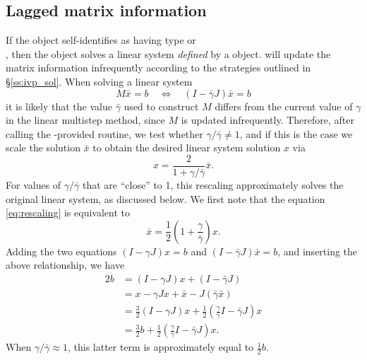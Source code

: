 \subsection{Lagged matrix information}
\label{ss:sunlinsol_lagged_matrix}

If the {\sunlinsol} object self-identifies as having type
 or \\ \noindent
{}, then the {\sunlinsol} object solves a
linear system \emph{defined} by a {\sunmatrix} object. {\cvls} will update the
matrix information infrequently according to the strategies outlined in
\S\ref{ss:ivp_sol}. When solving a linear system
\[
  M\bar{x} = b \quad\Leftrightarrow\quad (I-\bar{\gamma} J)\bar{x} = b
\]
it is likely that the value $\bar{\gamma}$ used to construct $M$
differs from the current value of $\gamma$ in the linear multistep method, since
$M$ is updated infrequently.  Therefore, after calling the
{\sunlinsol}-provided  routine, we test whether
$\gamma / \bar{\gamma} \ne 1$, and if this is the case we scale
the solution $\bar{x}$ to obtain the desired linear system
solution $x$ via
\begin{equation}
  \label{eq:rescaling}
  x = \frac{2}{1 + \gamma / \bar{\gamma}} \bar{x}.
\end{equation}
For values of $\gamma/\bar{\gamma}$ that are ``close'' to 1, this
rescaling approximately solves the original linear system, as
discussed below.  We first note that the equation \eqref{eq:rescaling}
is equivalent to
\[
  \bar{x} = \frac12 \left(1 + \frac{\gamma}{\bar{\gamma}}\right)x.
\]
Adding the two equations $(I-\gamma J)x=b$ and
$(I-\bar{\gamma}J)\bar{x}=b$, and inserting the above relationship, we
have
\begin{align*}
  2b &= (I-\gamma J)x + (I-\bar{\gamma}J) \\
     &= x - \gamma Jx + \bar{x} - J\left(\bar{\gamma}\bar{x}\right)\\
     &= \frac32\left(I - \gamma J\right)x + \frac12\left(\frac{\gamma}{\bar{\gamma}}I - \bar{\gamma} J\right)x\\
     &= \frac32 b + \frac12\left(\frac{\gamma}{\bar{\gamma}}I - \bar{\gamma} J\right)x.
\end{align*}
When $\gamma/\bar{\gamma}\approx 1$, this latter term is approximately
equal to $\frac12 b$.

